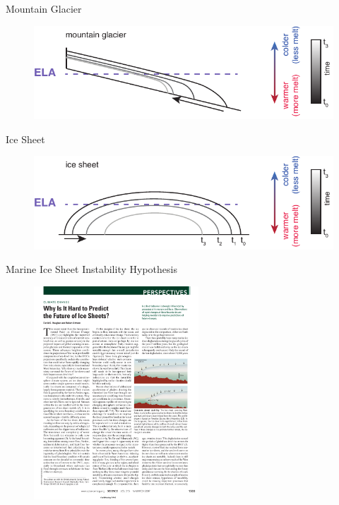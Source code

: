 \documentclass[hide notes,intlimits]{beamer}
\begin{document}
{
%
} 

\begin{frame}{Mountain Glacier}
 \begin{figure}
    \includegraphics[width=\textwidth]{bodvardsson-effect_mountain_glacier}
  \end{figure}
\end{frame}

\begin{frame}{Ice Sheet}
 \begin{figure}
    \includegraphics[width=\textwidth]{bodvardsson-effect_ice_sheet}
  \end{figure}
\end{frame}

\begin{frame}{Marine Ice Sheet Instability Hypothesis}
 \begin{figure}
    \includegraphics[height=8cm]{vaughan-misi}
  \end{figure}
\end{frame}
\end{document}
